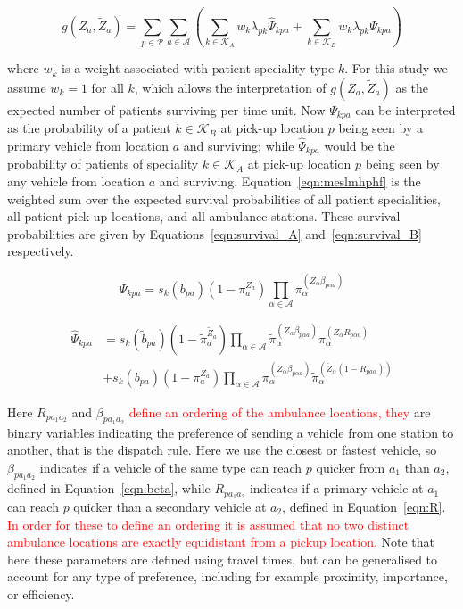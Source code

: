 \documentclass[numbers,webpdf,imaman]{ima-authoring-template}%
\begin{document}
\begin{equation}\label{eqn:meslmhphf}
g\left(Z_a, \tilde{Z}_a\right) =
\sum_{p \in \mathcal{P}} \sum_{a \in \mathcal{A}}
\left( \sum_{k \in \mathcal{K}_A}  w_k \lambda_{pk} \hat{\Psi}_{kpa} +
\sum_{k \in \mathcal{K}_B}  w_k \lambda_{pk} \Psi_{kpa} \right)
\end{equation}

\noindent
where $w_k$ is a weight associated with patient speciality type $k$. For this
study we assume $w_k = 1$ for all $k$, which allows the interpretation of
$g\left(Z_a, \tilde{Z}_a\right)$ as the expected number of patients surviving
per time unit. Now $\Psi_{kpa}$ can be interpreted as
the probability of a patient $k \in \mathcal{K}_B$ at pick-up location $p$
being seen by a primary vehicle from location $a$ and surviving; while
$\hat{\Psi}_{kpa}$ would be the probability of patients of speciality
$k \in \mathcal{K}_A$ at pick-up location $p$ being seen by any vehicle from
location $a$ and surviving. Equation~\ref{eqn:meslmhphf} is the weighted sum
over the expected survival probabilities of all patient specialities, all
patient pick-up locations, and all ambulance stations. These survival
probabilities are given by Equations~\ref{eqn:survival_A}
and~\ref{eqn:survival_B} respectively.

\begin{equation}\label{eqn:survival_A}
\Psi_{kpa} = s_k\left( b_{pa} \right)
\left(1 - \pi_{a}^{Z_a} \right)
\prod_{\alpha \in \mathcal{A}}
\pi_{\alpha}^{\left(Z_{\alpha} \beta_{p\alpha a} \right)}
\end{equation}

\begin{align}\label{eqn:survival_B}
\hat{\Psi}_{kpa} &= s_k\left(\tilde{b}_{pa}\right)
\left(1 - \tilde{\pi}_{a}^{\tilde{Z}_a} \right)
\prod_{\alpha \in \mathcal{A}}
\tilde{\pi}_{\alpha}^{\left(\tilde{Z}_{\alpha} \beta_{p\alpha a}\right)}
\pi_{\alpha}^{\left(Z_{\alpha} R_{p \alpha a}\right) } \nonumber \\
&+ s_k\left(b_{pa}\right) \left(1 - \pi_{a}^{Z_a} \right)
\prod_{\alpha \in \mathcal{A}}
\pi_{\alpha}^{\left(Z_{\alpha}\beta_{p\alpha a}\right)}
\tilde{\pi}_{\alpha}^{\left(\tilde{Z}_{\alpha}
\left(1 - R _{p a\alpha}\right)\right)}
\end{align}

Here $R_{p a_1 a_2}$ and $\beta_{p a_1 a_2}$ \textcolor{red}{define an ordering
of the ambulance locations, they} are binary variables indicating the preference
of sending a vehicle from one station to another, that is the dispatch rule.
Here we use the closest or fastest vehicle, so $\beta_{p a_1 a_2}$ indicates if
a vehicle of the same type can reach $p$ quicker from $a_1$ than $a_2$, defined
in Equation~\ref{eqn:beta}, while $R_{p a_1 a_2}$ indicates if a primary vehicle
at $a_1$ can reach $p$ quicker than a secondary vehicle at $a_2$, defined in
Equation~\ref{eqn:R}. \textcolor{red}{In order for these to define an ordering
it is assumed that no two distinct ambulance locations are exactly equidistant
from a pickup location.} Note that here these parameters are defined using
travel times, but can be generalised to account for any type of preference,
including for example proximity, importance, or efficiency.
\end{document}
